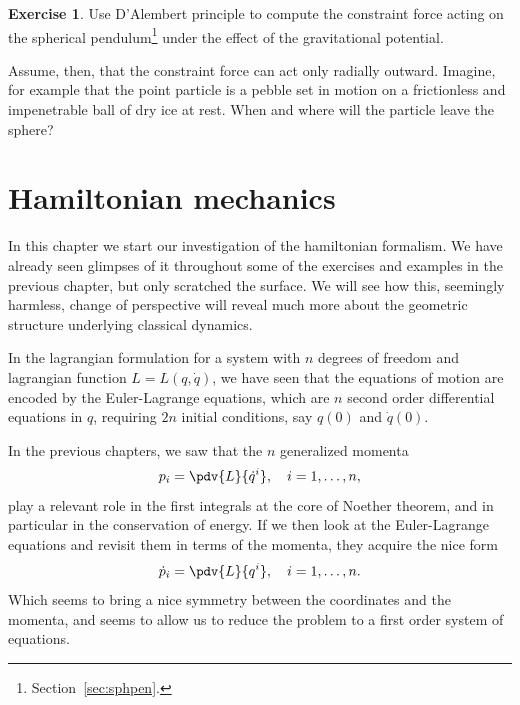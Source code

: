 \documentclass[english,fontsize=11pt,paper=b5]{scrbook}
\numberwithin{equation}{chapter}
\theoremstyle{definition}
\newtheorem{exercise}{Exercise}[chapter]
\begin{document}
    \begin{exercise}
      Use D'Alembert principle to compute the constraint force acting on the spherical pendulum\footnote{Section~\ref{sec:sphpen}.} under the effect of the gravitational potential.

      Assume, then, that the constraint force can act only radially outward. Imagine, for example that the point particle is a pebble set in motion on a frictionless and impenetrable ball of dry ice at rest.
      When and where will the particle leave the sphere?
    \end{exercise}


    \chapter{Hamiltonian mechanics}

    In this chapter we start our investigation of the hamiltonian formalism.
    We have already seen glimpses of it throughout some of the exercises and examples in the previous chapter, but only scratched the surface.
    We will see how this, seemingly harmless, change of perspective will reveal much more about the geometric structure underlying classical dynamics.

    In the lagrangian formulation for a system with $n$ degrees of freedom and lagrangian function $L=L(q, \dot q)$, we have seen that the equations of motion are encoded by the Euler-Lagrange equations, which are $n$ second order differential equations in $q$, requiring $2n$ initial conditions, say $q(0)$ and $\dot q(0)$.

    In the previous chapters, we saw that the $n$ generalized momenta
    \begin{equation}
      p_i = \pdv{L}{\dot q^i}, \quad i=1,\ldots,n,
    \end{equation}
    play a relevant role in the first integrals at the core of Noether theorem, and in particular in the conservation of energy.
    If we then look at the Euler-Lagrange equations and revisit them in terms of the momenta, they acquire the nice form
    \begin{equation}
      \dot p_i = \pdv{L}{q^i}, \quad i=1,\ldots,n.
    \end{equation}
    Which seems to bring a nice symmetry between the coordinates and the momenta, and seems to allow us to reduce the problem to a first order system of equations.
\end{document}
